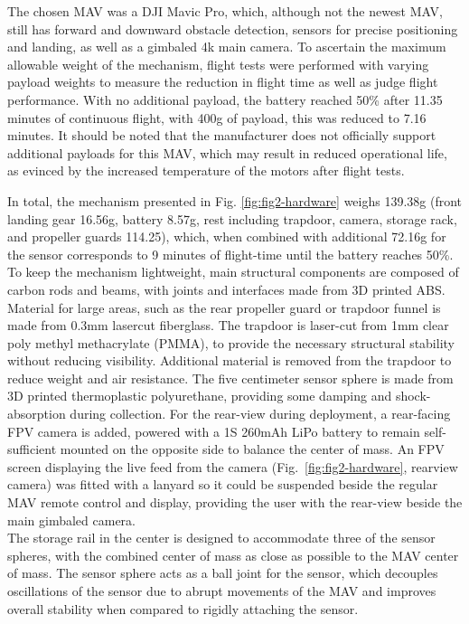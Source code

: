 The chosen \ac{MAV} was a DJI Mavic Pro, which, although not the newest \ac{MAV}, still has forward and downward obstacle detection, sensors for precise positioning and landing, as well as a gimbaled 4k main camera. To ascertain the maximum allowable weight of the mechanism, flight tests were performed with varying payload weights to measure the reduction in flight time as well as judge flight performance. With no additional payload, the battery reached 50\% after 11.35 minutes of continuous flight, with 400g of payload, this was reduced to 7.16 minutes. It should be noted that the manufacturer does not officially support additional payloads for this \ac{MAV}, which may result in reduced operational life, as evinced by the increased temperature of the motors after flight tests.

In total, the mechanism presented in Fig. \ref{fig:fig2-hardware} weighs 139.38g (front landing gear 16.56g, battery 8.57g, rest including trapdoor, camera, storage rack, and propeller guards 114.25), which, when combined with additional 72.16g for the sensor corresponds to 9 minutes of flight-time until the battery reaches 50\%. 
To keep the mechanism lightweight, main structural components are composed of carbon rods and beams, with joints and interfaces made from 3D printed ABS. Material for large areas, such as the rear propeller guard or trapdoor funnel is made from 0.3mm lasercut fiberglass. The trapdoor is laser-cut from 1mm clear poly methyl methacrylate (PMMA), to provide the necessary structural stability without reducing visibility. Additional material is removed from the trapdoor to reduce weight and air resistance. The five centimeter sensor sphere is made from 3D printed thermoplastic polyurethane, providing some damping and shock-absorption during collection. 
For the rear-view during deployment, a rear-facing \ac{FPV} camera is added, powered with a 1S 260mAh LiPo battery to remain self-sufficient mounted on the opposite side to balance the center of mass. An \ac{FPV} screen displaying the live feed from the camera (Fig.~\ref{fig:fig2-hardware}, rearview camera) was fitted with a lanyard so it could be suspended beside the regular \ac{MAV} remote control and display, providing the user with the rear-view beside the main gimbaled camera.
\\
\indent The storage rail in the center is designed to accommodate three of the sensor spheres, with the combined center of mass as close as possible to the \ac{MAV} center of mass. The sensor sphere acts as a ball joint for the sensor, which decouples oscillations of the sensor due to abrupt movements of the \ac{MAV} and improves overall stability when compared to rigidly attaching the sensor.  

